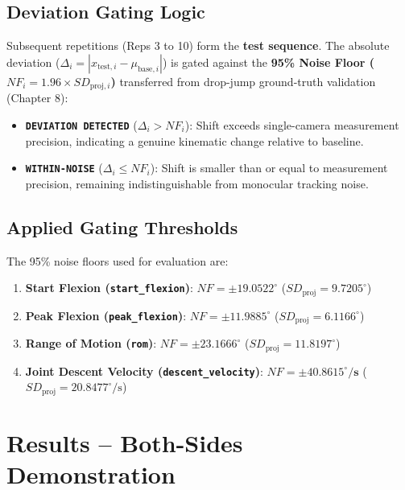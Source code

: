 \subsection{Deviation Gating Logic}
\label{sec:9-2-2-deviation-gating-logic}

Subsequent repetitions (Reps 3 to 10) form the \textbf{test sequence}. The absolute deviation ($\Delta_i = |x_{\text{test}, i} - \mu_{\text{base}, i}|$) is gated against the \textbf{95\% Noise Floor ($NF_i = 1.96 \times SD_{\text{proj}, i}$)} transferred from drop-jump ground-truth validation (Chapter 8):
\begin{itemize}
  \item \textbf{\texttt{DEVIATION DETECTED}} ($\Delta_i > NF_i$): Shift exceeds single-camera measurement precision, indicating a genuine kinematic change relative to baseline.
  \item \textbf{\texttt{WITHIN-NOISE}} ($\Delta_i \le NF_i$): Shift is smaller than or equal to measurement precision, remaining indistinguishable from monocular tracking noise.
\end{itemize}

\subsection{Applied Gating Thresholds}
\label{sec:9-2-3-applied-gating-thresholds}

The 95\% noise floors used for evaluation are:
\begin{enumerate}
  \item \textbf{Start Flexion (\texttt{start\_flexion})}: $NF = \mathbf{\pm 19.0522^\circ}$ ($SD_{\text{proj}} = 9.7205^\circ$)
  \item \textbf{Peak Flexion (\texttt{peak\_flexion})}: $NF = \mathbf{\pm 11.9885^\circ}$ ($SD_{\text{proj}} = 6.1166^\circ$)
  \item \textbf{Range of Motion (\texttt{rom})}: $NF = \mathbf{\pm 23.1666^\circ}$ ($SD_{\text{proj}} = 11.8197^\circ$)
  \item \textbf{Joint Descent Velocity (\texttt{descent\_velocity})}: $NF = \mathbf{\pm 40.8615^\circ/\text{s}}$ ($SD_{\text{proj}} = 20.8477^\circ/\text{s}$)
\end{enumerate}



\section{Results -- Both-Sides Demonstration}
\label{sec:9-3-results-both-sides-demonstration}


